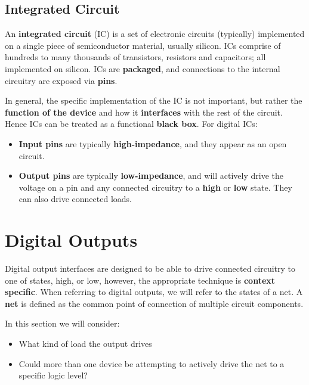 \documentclass{report}
\begin{document}
\subsection{Integrated Circuit}
An \textbf{integrated circuit} (IC) is a set of electronic circuits (typically) implemented on a
single piece of semiconductor material, usually silicon. ICs comprise of hundreds to
many thousands of transistors, resistors and capacitors; all implemented on silicon.
ICs are \textbf{packaged}, and connections to the internal circuitry are exposed via \textbf{pins}.

In general, the specific implementation of the IC is not important, but
rather the \textbf{function of the device} and how it \textbf{interfaces} with the rest of the circuit.
Hence ICs can be treated as a functional \textbf{black box}.
For digital ICs:
\begin{itemize}
    \item \textbf{Input pins} are typically \textbf{high-impedance}, and they appear as an open circuit.
    \item \textbf{Output pins} are typically \textbf{low-impedance}, and will actively drive the voltage
          on a pin and any connected circuitry to a \textbf{high} or \textbf{low} state. They can also
          drive connected loads.
\end{itemize}
\section{Digital Outputs}
Digital output interfaces are designed to be able to drive connected circuitry to one of states,
high, or low, however, the appropriate technique is \textbf{context specific}.
When referring to digital outputs, we will refer to the states of a net. A \textbf{net}
is defined as the common point of connection of multiple circuit components.

In this section we will consider:
\begin{itemize}
    \item What kind of load the output drives
    \item Could more than one device be attempting to actively drive the net
          to a specific logic level?
\end{itemize}
\end{document}
